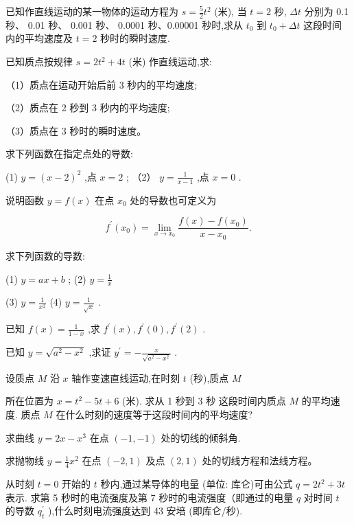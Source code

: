 \documentclass[lang=cn,newtx,10pt,scheme=chinese]{elegantbook}
\begin{document}
\begin{problemset}[习 题 四]

\item 已知作直线运动的某一物体的运动方程为 \(s = \frac{5}{2}{t}^{2}\) (米), 当 \(t = 2\) 秒, \({\Delta t}\) 分别为 0.1 秒、 0.01 秒、 0.001 秒、 0.0001 秒、0.00001 秒时,求从 \({t}_{0}\) 到 \({t}_{0} + {\Delta t}\) 这段时间内的平均速度及 \(t = 2\) 秒时的瞬时速度.

\item 已知质点按规律 \(s = 2{t}^{2} + {4t}\) (米) 作直线运动,求:

（1）质点在运动开始后前 3 秒内的平均速度;

（2）质点在 2 秒到 3 秒内的平均速度;

（3）质点在 3 秒时的瞬时速度。

\item 求下列函数在指定点处的导数:

(1) \(y = {\left( x - 2\right) }^{2}\) ,点 \(x = 2\) ; （2） \(y = \frac{1}{x - 1}\) ,点 \(x = 0\) .

\item 说明函数 \(y = f\left( x\right)\) 在点 \({x}_{0}\) 处的导数也可定义为

\[
{f}^{\prime }\left( {x}_{0}\right) = \mathop{\lim }\limits_{{x \rightarrow {x}_{0}}}\frac{f\left( x\right) - f\left( {x}_{0}\right) }{x - {x}_{0}}.
\]

\item 求下列函数的导数:

(1) \(y = {ax} + b\) ; (2) \(y = \frac{1}{x}\)

(3) \(y = \frac{1}{{x}^{2}}\) (4) \(y = \frac{1}{\sqrt{x}}\) .

\item 已知 \(f\left( x\right) = \frac{1}{1 - x}\) ,求 \({f}^{\prime }\left( x\right) ,{f}^{\prime }\left( 0\right) ,{f}^{\prime }\left( 2\right)\) .

\item 已知 \(y = \sqrt{{a}^{2} - {x}^{2}}\) ,求证 \({y}^{\prime } = - \frac{x}{\sqrt{{a}^{2} - {x}^{2}}}\) .

\item 设质点 \(M\) 沿 \(x\) 轴作变速直线运动,在时刻 \(t\) (秒),质点 \(M\)

所在位置为 \(x = {t}^{2} - {5t} + 6\) (米). 求从 1 秒到 3 秒 这段时间内质点 \(M\) 的平均速度. 质点 \(M\) 在什么时刻的速度等于这段时间内的平均速度?

\item 求曲线 \(y = {2x} - {x}^{3}\) 在点 \(\left( {-1, - 1}\right)\) 处的切线的倾斜角.

\item 求抛物线 \(y = \frac{1}{4}{x}^{2}\) 在点 \(\left( {-2,1}\right)\) 及点 \(\left( {2,1}\right)\) 处的切线方程和法线方程。

\item 从时刻 \(t = 0\) 开始的 \(t\) 秒内,通过某导体的电量 (单位: 库仑)可由公式 \(q = 2{t}^{2} + {3t}\) 表示. 求第 5 秒时的电流强度及第 7 秒时的电流强度（即通过的电量 \(q\) 对时间 \(t\) 的导数 \({q}_{t}^{\prime }\) ),什么时刻电流强度达到 43 安培 (即库仑/秒).

\end{problemset}
\end{document}
